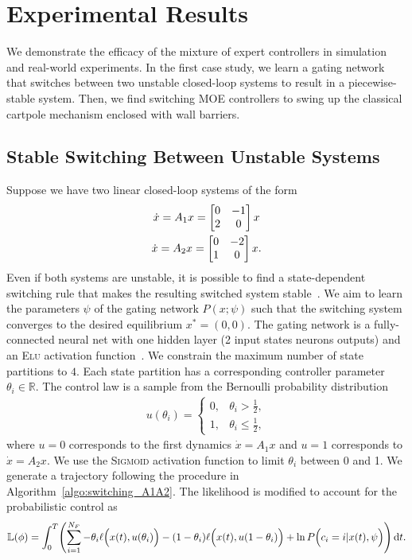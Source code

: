 \section{Experimental Results}
\label{sec:moe_results}
We demonstrate the efficacy of the mixture of expert controllers in simulation
and real-world experiments.
%
In the first case study, we learn a gating network that switches between two
unstable closed-loop systems to result in a piecewise-stable system.
%
Then, we find switching MOE controllers to swing up the classical cartpole
mechanism enclosed with wall barriers.
%

\subsection{Stable Switching Between Unstable Systems}

Suppose we have two linear closed-loop systems of the form 
\begin{equation}
    \begin{gathered}
        \dot{x} = A_1x = \begin{bmatrix}0 & -1 \\ 2 & 0\end{bmatrix}x \\
        \dot{x} = A_2x = \begin{bmatrix}0 & -2 \\ 1 & 0\end{bmatrix}x.
    \end{gathered}
    \label{eq:unstable_closedloop}
\end{equation}
%
Even if both systems are unstable, it is possible to find a state-dependent
switching rule that makes the resulting switched system
stable~\cite{liberzon2003switching}. 
%
We aim to learn the parameters $\psi$ of the gating network $P(x;
\psi)$ such that the switching system converges to the desired equilibrium $x^*
= (0, 0)$.
%
The gating network is a fully-connected neural net with one hidden layer (2 input states 
 neurons  outputs) and an \textsc{Elu} activation
function~\cite{clevert2015fast}.
%
We constrain the maximum number of state partitions to $4$.
%
Each state partition has a corresponding controller parameter $\theta_i \in
\mathbb{R}$. 
%
The control law is a sample from the Bernoulli probability distribution
\begin{align}
    u(\theta_i) = \begin{cases}
       0, & \theta_i > \frac{1}{2}, \\
       1, & \theta_i \leq \frac{1}{2},
    \end{cases}
\end{align}
\noindent where $u = 0$ corresponds to the first dynamics $\dot{x} = A_1
x$ and $u=1$ corresponds to $\dot{x} = A_2x$.
%
We use the \textsc{Sigmoid} activation function to limit $\theta_i$ between 0
and 1.
%
We generate a trajectory following the procedure in
Algorithm~\eqref{algo:switching_A1A2}.
%
The likelihood is modified to account for the probabilistic control as
\begin{align*}
    \mathbb{L}(\phi) = \int_{0}^{T} \Biggl( \sum_{i=1}^{N_F} - \theta_i \ell \Bigl(x(t), u(\theta_i) \Bigr) - (1- \theta_i)\ell \Bigl(x(t), u(1-\theta_i) \Bigr) +
    \ln  P\Bigl(c_i = i | x(t), \psi \Bigr)  \Biggr) \operatorname{d}\! t.
\end{align*}

